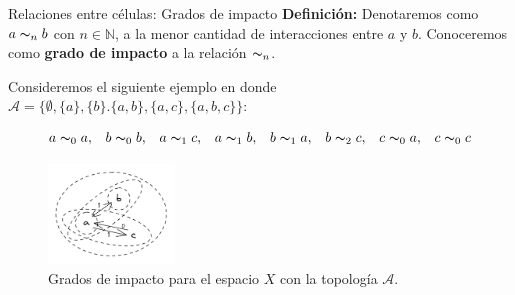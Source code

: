 \documentclass[9pt]{beamer}
\begin{document}
\begin{frame}{Relaciones entre células: Grados de impacto}
\textbf{Definición:} Denotaremos como $a\thicksim_n b$ con $n\in\mathbb{N}$, a la menor cantidad de interacciones entre $a$ y $b$. Conoceremos como \textbf{grado de impacto} a la relación $\thicksim_n$.

Consideremos el siguiente ejemplo en donde $\mathcal{A}=\{\emptyset,\{a\},\{b\}.\{a,b\},\{a,c\},\{a,b,c\}\}$:

$$\begin{array}{cccccccc}
    a\thicksim_0 a, & b\thicksim_0 b, & a\thicksim_1 c, & a\thicksim_1 b, &
    b\thicksim_1 a, & b\thicksim_2 c, & c\thicksim_0 a, & c\thicksim_0 c
\end{array}$$
\begin{figure}[h]
  \centering
    \includegraphics[width=0.3\textwidth]{Imagenes/grados_de_impacto.PNG}
  \caption{Grados de impacto para el espacio $X$ con la topología $\mathcal{A}$.}
  \label{fig:gradoImpacto}
\end{figure}
\end{frame}
\end{document}
